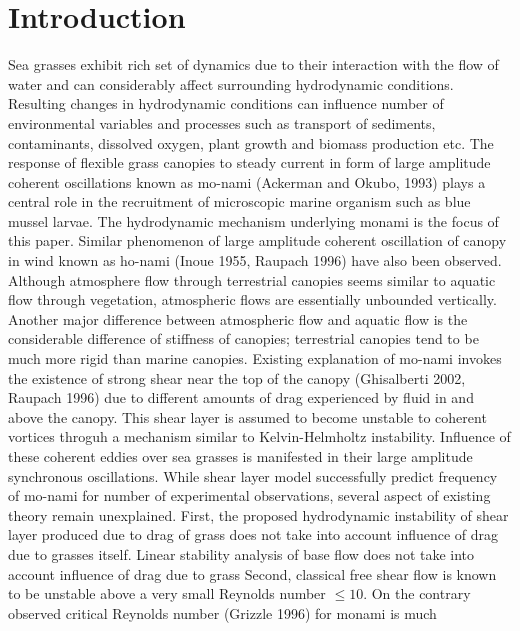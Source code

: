 \documentclass[aps,twocolumn,floatfix,prl,10pt]{revtex4-1}
\begin{document}
\section{Introduction}
Sea grasses exhibit rich set of dynamics due to their interaction with the flow of water and can considerably affect surrounding hydrodynamic conditions.
Resulting changes in hydrodynamic conditions can influence number of environmental variables and processes such as 
transport of sediments, contaminants, dissolved oxygen, plant growth and biomass production etc. 
The response of flexible grass canopies to steady current in form of large amplitude coherent oscillations known as mo-nami (Ackerman and Okubo, 1993) plays a central role
in the recruitment of microscopic marine organism such as blue mussel larvae. The hydrodynamic mechanism underlying monami is the focus of this paper. 
\newline
Similar phenomenon of large amplitude coherent oscillation of canopy in wind known as ho-nami (Inoue 1955, Raupach 1996) have also been observed.
Although atmosphere flow through terrestrial canopies seems similar to aquatic flow through vegetation, atmospheric flows are essentially unbounded vertically. Another major
difference between atmospheric flow and aquatic flow is the considerable difference of stiffness of canopies; terrestrial canopies tend to be much more rigid than marine canopies.
\newline   
Existing explanation of mo-nami invokes the existence of strong shear near the top of the canopy (Ghisalberti 2002, Raupach 1996) due to
different amounts of drag experienced by fluid in and above the canopy. This shear layer is assumed to become unstable to coherent vortices throguh a mechanism similar to Kelvin-Helmholtz
instability. Influence of these coherent eddies over sea grasses is manifested in their large amplitude synchronous oscillations.
\newline
While shear layer model successfully predict frequency of mo-nami for number of experimental observations,
several aspect of existing theory remain unexplained. First, the proposed hydrodynamic instability of shear layer produced due to drag of 
grass does not take into account influence of drag due to grasses itself.
Linear stability analysis of base flow does not take into account influence of drag due to grass  
Second, classical free shear flow is known to be unstable above a very small Reynolds number $\leq 10 $. On the contrary observed critical Reynolds number (Grizzle 1996) for monami is much
\end{document}
